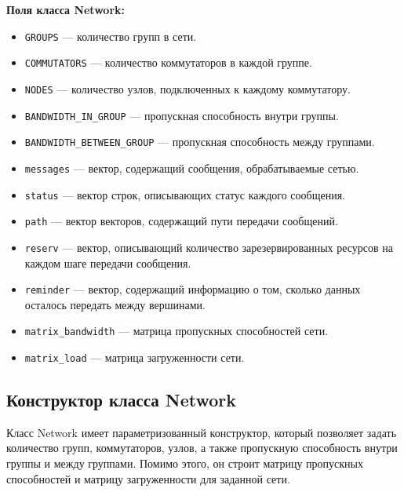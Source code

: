 \documentclass[11pt,a4paper,final]{article} %
\begin{document}
\textbf{Поля класса Network:}
\begin{itemize}
	\item \texttt{GROUPS} — количество групп в сети.
	\item \texttt{COMMUTATORS} — количество коммутаторов в каждой группе.
	\item \texttt{NODES} — количество узлов, подключенных к каждому коммутатору.
	\item \texttt{BANDWIDTH\_IN\_GROUP} — пропускная способность внутри группы.
	\item \texttt{BANDWIDTH\_BETWEEN\_GROUP} — пропускная способность между группами.
	\item \texttt{messages} — вектор, содержащий сообщения, обрабатываемые сетью.
	\item \texttt{status} — вектор строк, описывающих статус каждого сообщения.
	\item \texttt{path} — вектор векторов, содержащий пути передачи сообщений.
	\item \texttt{reserv} — вектор, описывающий количество зарезервированных ресурсов на каждом шаге передачи сообщения.
	\item \texttt{reminder} — вектор, содержащий информацию о том, сколько данных осталось передать между вершинами.
	\item \texttt{matrix\_bandwidth} — матрица пропускных способностей сети.
	\item \texttt{matrix\_load} — матрица загруженности сети.
\end{itemize}

\subsection{Конструктор класса Network}

Класс Network имеет параметризованный конструктор, который позволяет задать количество групп, коммутаторов, узлов, а также пропускную способность внутри группы и между группами. Помимо этого, он строит матрицу пропускных способностей и матрицу загруженности для заданной сети.
\end{document}

